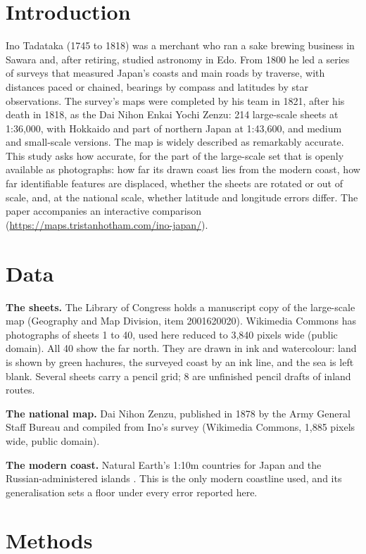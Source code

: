\documentclass[11pt,a4paper]{article}
\begin{document}
\section{Introduction}
Ino Tadataka (1745 to 1818) was a merchant who ran a sake brewing business in Sawara and, after retiring, studied astronomy in Edo. From 1800 he led a series of surveys that measured Japan's coasts and main roads by traverse, with distances paced or chained, bearings by compass and latitudes by star observations. The survey's maps were completed by his team in 1821, after his death in 1818, as the Dai Nihon Enkai Yochi Zenzu: 214 large-scale sheets at 1:36,000, with Hokkaido and part of northern Japan at 1:43,600, and medium and small-scale versions. The map is widely described as remarkably accurate. This study asks how accurate, for the part of the large-scale set that is openly available as photographs: how far its drawn coast lies from the modern coast, how far identifiable features are displaced, whether the sheets are rotated or out of scale, and, at the national scale, whether latitude and longitude errors differ. The paper accompanies an interactive comparison (\url{https://maps.tristanhotham.com/ino-japan/}).

\section{Data}
\textbf{The sheets.} The Library of Congress holds a manuscript copy of the large-scale map (Geography and Map Division, item 2001620020). Wikimedia Commons has photographs of sheets 1 to 40, used here reduced to 3,840 pixels wide (public domain). All 40 show the far north. They are drawn in ink and watercolour: land is shown by green hachures, the surveyed coast by an ink line, and the sea is left blank. Several sheets carry a pencil grid; 8 are unfinished pencil drafts of inland routes.

\textbf{The national map.} Dai Nihon Zenzu, published in 1878 by the Army General Staff Bureau and compiled from Ino's survey (Wikimedia Commons, 1,885 pixels wide, public domain).

\textbf{The modern coast.} Natural Earth's 1:10m countries for Japan and the Russian-administered islands \citep{naturalearth}. This is the only modern coastline used, and its generalisation sets a floor under every error reported here.

\section{Methods}
\end{document}
